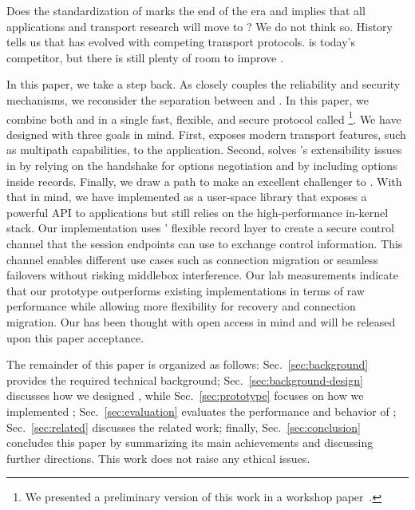 Does the standardization of \quic marks the end of the \tcp era and implies that
all applications and transport research will move to \quic?  We do not think
so. History tells us that \tcp has evolved with competing transport protocols.
\quic is today's competitor, but there is still plenty of room to improve \tcp.

In this paper, we take a step back. As \quic closely couples the reliability and
security mechanisms, we reconsider the separation between \tcp and \tls.  In
this paper, we combine both \tcp and  in a single fast, flexible, and
secure protocol called \textbf{\tcpls}\footnote{We presented a preliminary version of this work in a workshop paper~\cite{rochet2020tcpls}.}. We have
designed \tcpls with three goals in mind. First, \tcpls exposes modern transport
features, such as multipath capabilities, to the application. Second, \tcpls
solves \tcp's extensibility issues in \tcp by relying on the \tls handshake for
\tcp options negotiation and by including \tcp options inside \tls records.
Finally, we draw a path to make \tcpls an excellent challenger to \quic.  With that in mind, we have implemented \tcpls as a user-space library that exposes a powerful API to applications but still relies on the high-performance in-kernel \tcp stack. Our implementation uses \tls' flexible record layer to create a secure control channel that the \tcpls session endpoints can use to exchange
control information. This channel enables different use cases such as connection
migration or seamless failovers without risking middlebox interference. Our lab
measurements indicate that our \tcpls prototype outperforms existing \quic
implementations in terms of raw performance while allowing more flexibility
for recovery and connection migration. Our \tcpls has been thought
with open access in mind and will be released upon this paper acceptance.

The remainder of this paper is organized as follows: Sec.~\ref{sec:background}
provides the required technical background; Sec.~\ref{sec:background-design}
discusses how we designed \tcpls, while Sec.~\ref{sec:prototype} focuses on how
we implemented \tcpls; Sec.~\ref{sec:evaluation} evaluates the performance and
behavior of \tcpls; Sec.~\ref{sec:related} discusses the related work;  finally, Sec.~\ref{sec:conclusion} concludes this paper by
summarizing its main achievements and discussing further directions.  This work
does not raise any ethical issues.
